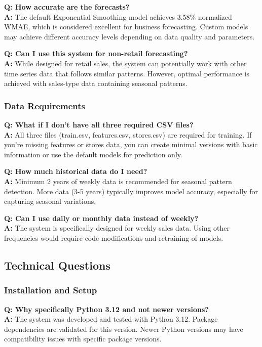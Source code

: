 \textbf{Q: How accurate are the forecasts?}\\
\textbf{A:} The default Exponential Smoothing model achieves 3.58\% normalized WMAE, which is considered excellent for business forecasting. Custom models may achieve different accuracy levels depending on data quality and parameters.

\textbf{Q: Can I use this system for non-retail forecasting?}\\
\textbf{A:} While designed for retail sales, the system can potentially work with other time series data that follows similar patterns. However, optimal performance is achieved with sales-type data containing seasonal patterns.

\subsubsection{Data Requirements}

\textbf{Q: What if I don't have all three required CSV files?}\\
\textbf{A:} All three files (train.csv, features.csv, stores.csv) are required for training. If you're missing features or stores data, you can create minimal versions with basic information or use the default models for prediction only.

\textbf{Q: How much historical data do I need?}\\
\textbf{A:} Minimum 2 years of weekly data is recommended for seasonal pattern detection. More data (3-5 years) typically improves model accuracy, especially for capturing seasonal variations.

\textbf{Q: Can I use daily or monthly data instead of weekly?}\\
\textbf{A:} The system is specifically designed for weekly sales data. Using other frequencies would require code modifications and retraining of models.

\subsection{Technical Questions}

\subsubsection{Installation and Setup}

\textbf{Q: Why specifically Python 3.12 and not newer versions?}\\
\textbf{A:} The system was developed and tested with Python 3.12. Package dependencies are validated for this version. Newer Python versions may have compatibility issues with specific package versions.

